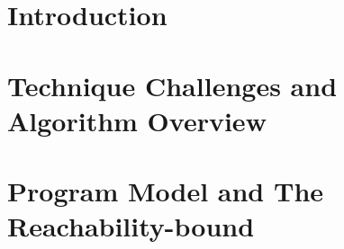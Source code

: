 \documentclass[runningheads]{llncs}
\begin{document}
\section{Introduction}
\label{sec:intro}



\section{Technique Challenges and Algorithm Overview}
\label{sec:overview}


\section{Program Model and The Reachability-bound}
\label{sec:preliminary}
% 




% 
% 
\end{document}
